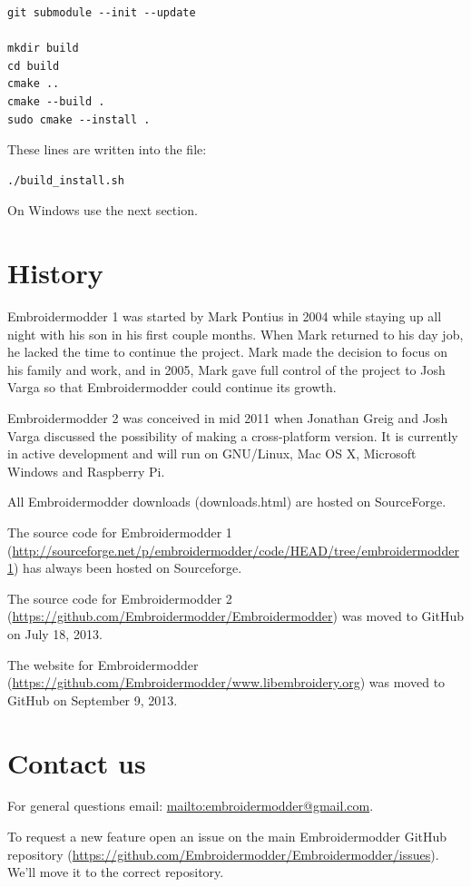 \documentclass[a4paper]{report}
\begin{document}
\begin{lstlisting}
git submodule --init --update

mkdir build
cd build
cmake ..
cmake --build .
sudo cmake --install .
\end{lstlisting}

These lines are written into the file:

\begin{lstlisting}
./build_install.sh
\end{lstlisting}

On Windows use the next section.

\section{History}

Embroidermodder 1 was started by Mark Pontius in 2004 while staying up all night
with his son in his first couple months. When Mark returned to his day job, he
lacked the time to continue the project. Mark made the decision to focus on his
family and work, and in 2005, Mark gave full control of the project to Josh
Varga so that Embroidermodder could continue its growth.

Embroidermodder 2 was conceived in mid 2011 when Jonathan Greig and Josh Varga
discussed the possibility of making a cross-platform version. It is currently in
active development and will run on GNU/Linux, Mac OS X, Microsoft Windows and
Raspberry Pi.

All Embroidermodder downloads (downloads.html) are hosted on SourceForge.

The source code for Embroidermodder 1
(\url{http://sourceforge.net/p/embroidermodder/code/HEAD/tree/embroidermodder1})
has always been hosted on Sourceforge.

The source code for Embroidermodder 2
(\url{https://github.com/Embroidermodder/Embroidermodder}) was moved to GitHub
on July 18, 2013.

The website for Embroidermodder
(\url{https://github.com/Embroidermodder/www.libembroidery.org}) was moved to
GitHub on September 9, 2013.

\section{Contact us}

For general questions email: \url{mailto:embroidermodder@gmail.com}.

To request a new feature  open an issue on the main Embroidermodder GitHub
repository (\url{https://github.com/Embroidermodder/Embroidermodder/issues}).
We'll move it to the correct repository.
\end{document}
